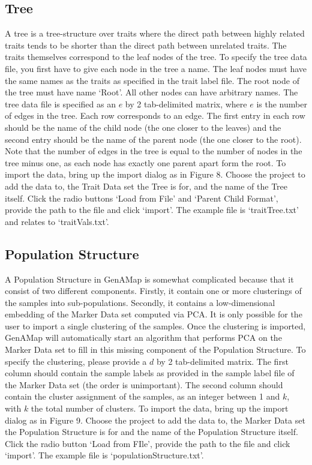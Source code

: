 \documentclass{article}
\begin{document}
\subsection{Tree}

A tree is a tree-structure over traits where the direct path between highly related traits tends to be shorter than the direct path between unrelated traits. The traits themselves correspond to the leaf nodes of the tree. To specify the tree data file, you first have to give each node in the tree a name. The leaf nodes must have the same names as the traits as specified in the trait label file. The root node of the tree must have name `Root'. All other nodes can have arbitrary names. The tree data file is specified as an $e$ by 2 tab-delimited matrix, where $e$ is the number of edges in the tree. Each row corresponds to an edge. The first entry in each row should be the name of the child node (the one closer to the leaves) and the second entry should be the name of the parent node (the one closer to the root). Note that the number of edges in the tree is equal to the number of nodes in the tree minus one, as each node has exactly one parent apart form the root. To import the data, bring up the import dialog as in Figure 8. Choose the project to add the data to, the Trait Data set the Tree is for, and the name of the Tree itself. Click the radio buttons `Load from File' and `Parent Child Format', provide the path to the file and click `import'. The example file is `traitTree.txt' and relates to `traitVals.txt'.

\subsection{Population Structure}

A Population Structure in GenAMap is somewhat complicated because that it consist of two different components. Firstly, it contain one or more clusterings of the samples into sub-populations. Secondly, it contains a low-dimensional embedding of the Marker Data set computed via PCA. It is only possible for the user to import a single clustering of the samples. Once the clustering is imported, GenAMap will automatically start an algorithm that performs PCA on the Marker Data set to fill in this missing component of the Population Structure. To specify the clustering, please provide a $d$ by 2 tab-delimited matrix. The first column should contain the sample labels as provided in the sample label file of the Marker Data set (the order is unimportant). The second column should contain the cluster assignment of the samples, as an integer between 1 and $k$, with $k$ the total number of clusters. To import the data, bring up the import dialog as in Figure 9. Choose the project to add the data to, the Marker Data set the Population Structure is for and the name of the Population Structure itself. Click the radio button `Load from FIle', provide the path to the file and click `import'. The example file is `populationStructure.txt'.
\end{document}
